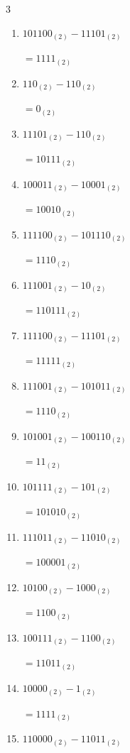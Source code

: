 \begin{multicols}{3}
\begin{enumerate}
  \item $101100_{(2)} - 11101_{(2)}$

        $=1111_{(2)}$

  \item $110_{(2)} - 110_{(2)}$

        $=0_{(2)}$

  \item $11101_{(2)} - 110_{(2)}$

        $=10111_{(2)}$

  \item $100011_{(2)} - 10001_{(2)}$

        $=10010_{(2)}$

  \item $111100_{(2)} - 101110_{(2)}$

        $=1110_{(2)}$

\columnbreak %

  \item $111001_{(2)} - 10_{(2)}$

        $=110111_{(2)}$

  \item $111100_{(2)} - 11101_{(2)}$

        $=11111_{(2)}$

  \item $111001_{(2)} - 101011_{(2)}$

        $=1110_{(2)}$

  \item $101001_{(2)} - 100110_{(2)}$

        $=11_{(2)}$

  \item $101111_{(2)} - 101_{(2)}$

        $=101010_{(2)}$

  \item $111011_{(2)} - 11010_{(2)}$

        $=100001_{(2)}$

  \item $10100_{(2)} - 1000_{(2)}$

        $=1100_{(2)}$

  \item $100111_{(2)} - 1100_{(2)}$

        $=11011_{(2)}$

  \item $10000_{(2)} - 1_{(2)}$

        $=1111_{(2)}$

  \item $110000_{(2)} - 11011_{(2)}$


\end{enumerate}
\end{multicols}
